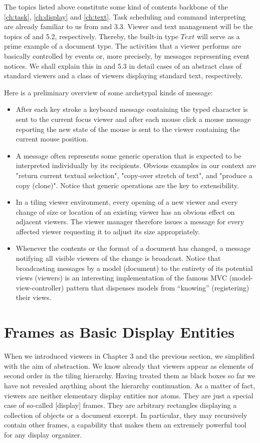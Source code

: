 The topics listed above constitute some kind of contents backbone of the \ref{ch:task}, \ref{ch:display} 
and \ref{ch:text}. Task scheduling and command interpreting are already familiar to us from  and 3.3. Viewer and text management will be the topics of  and 5.2, respectively.
Thereby, the built-in type $Text$ will serve as a prime example of a document type.
The activities that a viewer performs are basically controlled by events or, more precisely, by
messages representing event notices. We shall explain this in  and 5.3 in detail cases of an abstract class of standard viewers and a class of viewers displaying standard text, respectively.

Here is a preliminary overview of some archetypal kinds of message:
\begin{itemize}
	\item After each key stroke a keyboard message containing the typed character is sent to the current focus viewer and after each mouse click a mouse message reporting the new state of the mouse is sent to the viewer containing the current mouse position.
	\item A message often represents some generic operation that is expected to be interpreted individually by its recipients. Obvious examples in our context are "return current textual selection", "copy-over stretch of text", and "produce a copy (clone)". Notice that generic operations are the key to extensibility.
	\item In a tiling viewer environment, every opening of a new viewer and every change of size or location of an existing viewer has an obvious effect on adjacent viewers. The viewer manager therefore issues a message for every affected viewer requesting it to adjust its size appropriately.
	\item Whenever the contents or the format of a document has changed, a message notifying all visible viewers of the change is broadcast. Notice that broadcasting messages by a model (document) to the entirety of its potential views (viewers) is an interesting implementation of the famous MVC (model-view-controller) pattern that dispenses models from “knowing” (registering) their views.
\end{itemize}

\section{Frames as Basic Display Entities}
When we introduced viewers in Chapter 3 and the previous section, we simplified with the aim of abstraction. We know already that viewers appear as elements of second order in the tiling hierarchy. Having treated them as black boxes so far we have not revealed anything about the hierarchy continuation. As a matter of fact, viewers are neither elementary display entities nor atoms. They are just a special case of so-called [display] frames. They are arbitrary rectangles displaying a collection of objects or a document excerpt. In particular, they may recursively contain other frames, a capability that makes them an
extremely powerful tool for any display organizer.

